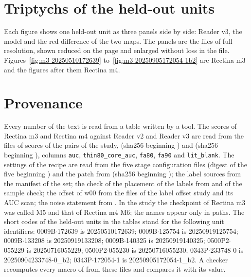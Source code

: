 \begin{table}[!t]
\caption{Combinations of Rectina m3, Rectina m4, Reader v2 and Reader v3 on the fourteen units.}\label{tab:pairs}
\centering

\end{table}

\section{Triptychs of the held-out units}

Each figure shows one held-out unit as three panels side by side: Reader v3, the model and the red difference of the two maps. The panels are the files of full resolution, shown reduced on the page and enlarged without loss in the file. Figures~\ref{fig:m3-20250510172639} to~\ref{fig:m3-20250905172054-1b2} are Rectina m3 and the figures after them Rectina m4.





\section{Provenance}

Every number of the text is read from a table written by a tool. The scores of Rectina m3 and Rectina m4 against Reader v2 and Reader v3 are read from the files of scores of the pairs of the study,  (sha256 beginning \ShaPairsControl{}) and  (sha256 beginning \ShaPairsHeld{}), columns \texttt{auc}, \texttt{thin80\_core\_auc}, \texttt{fa80}, \texttt{fa90} and \texttt{lit\_blank}. The settings of the recipe are read from the five stage configuration files (digest of the five beginning \ShaConfigs{}) and the patch from  (sha256 beginning \PatchSha{}); the label sources from the manifest of the set; the check of the placement of the labels from  and  of the sample check; the offset of w00 from the files of the label offset study and its AUC scan; the noise statement from . In the study the checkpoint of Rectina m3 was called M5 and that of Rectina m4 M6; the names appear only in paths. The short codes of the held-out units in
the tables stand for the following unit identifiers: 0009B$\cdot$172639 is 20250510172639; 0009B$\cdot$125754 is 20250919125754; 0009B$\cdot$133208 is 20250919133208; 0009B$\cdot$140325 is 20250919140325; 0500P2$\cdot$055229 is 20250716055229; 0500P2$\cdot$055230 is 20250716055230; 0343P$\cdot$233748-0 is 20250904233748-0\_b2; 0343P$\cdot$172054-1 is 20250905172054-1\_b2. A checker recomputes every macro of  from these files and compares it with its value.


